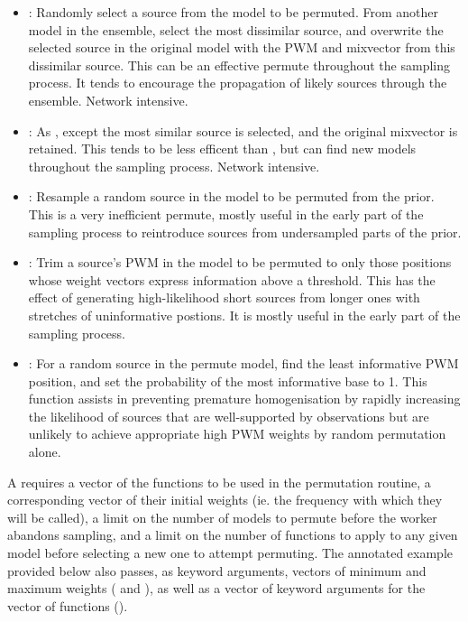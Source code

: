 \begin{itemize}
    \item {}: Randomly select a source from the model to be permuted. From another model in the ensemble, select the most dissimilar source, and overwrite the selected source in the original model with the PWM and mixvector from this dissimilar source. This can be an effective permute throughout the sampling process. It tends to encourage the propagation of likely sources through the ensemble. Network intensive.
    \item {}: As , except the most similar source is selected, and the original mixvector is retained. This tends to be less efficent than , but can find new models throughout the sampling process. Network intensive.
    \item {}: Resample a random source in the model to be permuted from the prior. This is a very inefficient permute, mostly useful in the early part of the sampling process to reintroduce sources from undersampled parts of the prior.
    \item {}: Trim a source's PWM in the model to be permuted to only those positions whose weight vectors express information above a threshold. This has the effect of generating high-likelihood short sources from longer ones with stretches of uninformative postions. It is mostly useful in the early part of the sampling process.
    \item {}: For a random source in the permute model, find the least informative PWM position, and set the probability of the most informative base to 1. This function assists in preventing premature homogenisation by rapidly increasing the likelihood of sources that are well-supported by observations but are unlikely to achieve appropriate high PWM weights by random permutation alone.
\end{itemize}

A  requires a vector of the functions to be used in the permutation routine, a corresponding vector of their initial weights (ie. the frequency with which they will be called), a limit on the number of models to permute before the worker abandons sampling, and a limit on the number of functions to apply to any given model before selecting a new one to attempt permuting. The annotated example provided below also passes, as keyword arguments, vectors of minimum and maximum weights ( and ), as well as a vector of keyword arguments for the vector of functions ().

